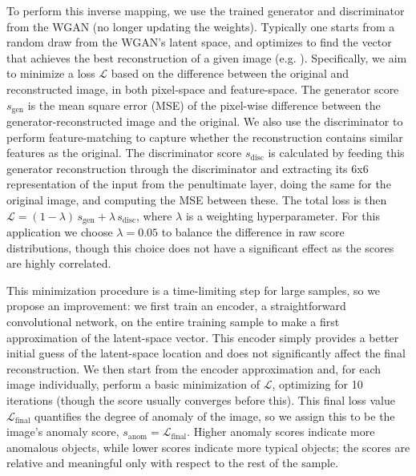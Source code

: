 \documentclass{article}
\begin{document}
To perform this inverse mapping, we use the trained generator and discriminator from the WGAN (no longer updating the weights).
Typically one starts from a random draw from the WGAN's latent space, and optimizes to find the vector that achieves the best reconstruction of a given image (e.g. \citealt{Schlegl2017}).
Specifically, we aim to minimize a loss $\mathcal{L}$ based on the difference between the original and reconstructed image, in both pixel-space and feature-space.
The generator score $s_\mathrm{gen}$ is the mean square error (MSE) of the pixel-wise difference between the generator-reconstructed image and the original.
We also use the discriminator to perform feature-matching to capture whether the reconstruction contains similar features as the original.
The discriminator score $s_\mathrm{disc}$ is calculated by feeding this generator reconstruction through the discriminator and extracting its 6x6 representation of the input from the penultimate layer, doing the same for the original image, and computing the MSE between these.
The total loss is then $\mathcal{L} = (1-\lambda) \, s_\mathrm{gen} + \lambda \, s_\mathrm{disc}$, where $\lambda$ is a weighting hyperparameter.
For this application we choose $\lambda=0.05$ to balance the difference in raw score distributions, though this choice does not have a significant effect as the scores are highly correlated.

This minimization procedure is a time-limiting step for large samples, so we propose an improvement: we first train an encoder, a straightforward convolutional network, on the entire training sample to make a first approximation of the latent-space vector.
This encoder simply provides a better initial guess of the latent-space location and does not significantly affect the final reconstruction.
We then start from the encoder approximation and, for each image individually, perform a basic minimization of $\mathcal{L}$, optimizing for 10 iterations (though the score usually converges before this).
This final loss value $\mathcal{L}_\mathrm{final}$ quantifies the degree of anomaly of the image, so we assign this to be the image's anomaly score, $s_\mathrm{anom} = \mathcal{L}_\mathrm{final}$. 
Higher anomaly scores indicate more anomalous objects, while lower scores indicate more typical objects; the scores are relative and meaningful only with respect to the rest of the sample.
\end{document}
